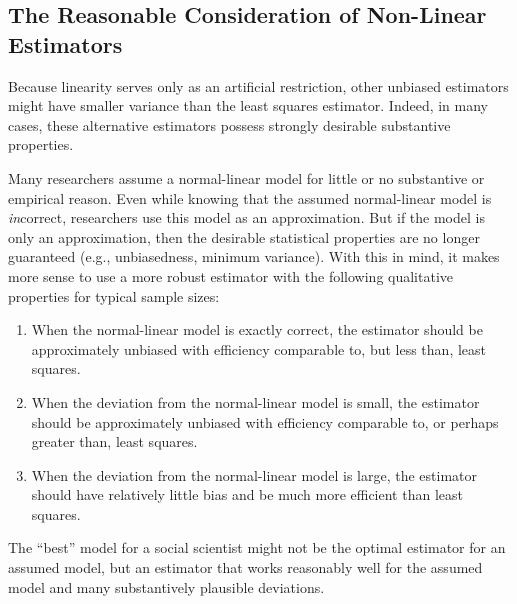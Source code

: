 \documentclass[12pt]{article}
\begin{document}


\subsection*{The Reasonable Consideration of Non-Linear Estimators}

Because linearity serves only as an artificial restriction, other unbiased estimators might have smaller variance than the least squares estimator. Indeed, in many cases, these alternative estimators possess strongly desirable substantive properties.

Many researchers assume a normal-linear model for little or no substantive or empirical reason. 
Even while knowing that the assumed normal-linear model is \textit{in}correct, researchers use this model as an approximation. 
But if the model is only an approximation, then the desirable statistical properties are no longer guaranteed (e.g., unbiasedness, minimum variance). 
With this in mind, it makes more sense to use a more robust estimator with the following qualitative properties for typical sample sizes:
\begin{enumerate}
\item When the normal-linear model is exactly correct, the estimator should be approximately unbiased with efficiency comparable to, but less than, least squares.
\item When the deviation from the normal-linear model is small, the estimator should be approximately unbiased with efficiency comparable to, or perhaps greater than, least squares.
\item When the deviation from the normal-linear model is large, the estimator should have relatively little bias and be much more efficient than least squares.
\end{enumerate}
\noindent The ``best'' model for a social scientist might not be the optimal estimator for an assumed model, but an estimator that works reasonably well for the assumed model and many substantively plausible deviations. 
\end{document}
